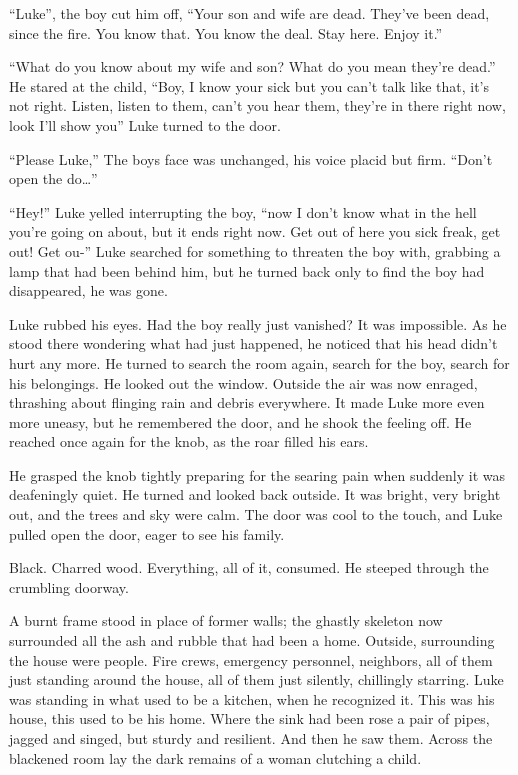 ``Luke'', the boy cut him off, ``Your son and wife are dead. They've
been dead, since the fire. You know that. You know the deal. Stay
here. Enjoy it.''

``What do you know about my wife and son? What do you mean they're
dead.'' He stared at the child, ``Boy, I know your sick but you can't
talk like that, it's not right. Listen, listen to them, can't you hear
them, they're in there right now, look I'll show you'' Luke turned to
the door.

``Please Luke,'' The boys face was unchanged, his voice placid but
firm. ``Don't open the do\ldots{}''

``Hey!'' Luke yelled interrupting the boy, ``now I don't know what in
the hell you're going on about, but it ends right now. Get out of here
you sick freak, get out! Get ou-'' Luke searched for something to
threaten the boy with, grabbing a lamp that had been behind him, but he
turned back only to find the boy had disappeared, he was gone.

Luke rubbed his eyes. Had the boy really just vanished? It was
impossible. As he stood there wondering what had just happened, he
noticed that his head didn't hurt any more. He turned to search the
room again, search for the boy, search for his belongings. He looked out
the window. Outside the air was now enraged, thrashing about flinging
rain and debris everywhere. It made Luke more even more uneasy, but he
remembered the door, and he shook the feeling off. He reached once again
for the knob, as the roar filled his ears.

He grasped the knob tightly preparing for the searing pain when suddenly
it was deafeningly quiet. He turned and looked back outside. It was
bright, very bright out, and the trees and sky were calm. The door was
cool to the touch, and Luke pulled open the door, eager to see his
family.

Black. Charred wood. Everything, all of it, consumed. He steeped through
the crumbling doorway.

A burnt frame stood in place of former walls; the ghastly skeleton now
surrounded all the ash and rubble that had been a home. Outside,
surrounding the house were people. Fire crews, emergency personnel,
neighbors, all of them just standing around the house, all of them just
silently, chillingly starring. Luke was standing in what used to be a
kitchen, when he recognized it. This was his house, this used to be his
home. Where the sink had been rose a pair of pipes, jagged and singed,
but sturdy and resilient. And then he saw them. Across the blackened
room lay the dark remains of a woman clutching a child.

